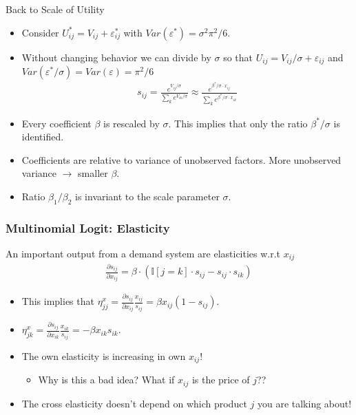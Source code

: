 \begin{frame}{Back to Scale of Utility}
\begin{itemize}
\item Consider $U_{ij}^{*} = V_{ij} + \varepsilon_{ij}^{*}$ with $Var(\varepsilon^{*}) = \sigma^2 \pi^2/6$.
\item Without changing behavior we can divide by $\sigma$ so that $U_{ij} = V_{ij}/\sigma + \varepsilon_{ij}$ and $Var(\varepsilon^{*}/\sigma)=Var(\varepsilon) = \pi^2/6$
\begin{align*}
s_{ij} = \frac{e^{V_{ij}/\sigma}}{\sum_k e^{V_{ik}/\sigma}} \approx \frac{e^{\beta^{*}/\sigma \cdot x_{ij}}}{\sum_k e^{\beta^{*}/\sigma \cdot x_{ik}}}
\end{align*}
\item Every coefficient $\beta$ is rescaled by $\sigma$. This implies that only the ratio $\beta^{*}/\sigma$ is identified. 
\item Coefficients are relative to variance of unobserved factors. More unobserved variance $\longrightarrow$ smaller $\beta$.
\item Ratio $\beta_1/\beta_2$ is invariant to the scale parameter $\sigma$.
\end{itemize}
\end{frame}


\begin{frame}
\frametitle{Multinomial Logit: Elasticity}
An important output from a demand system are elasticities w.r.t $x_{ij}$
\begin{align*}
\frac{\partial s_{ij}}{\partial x_{ij}} = \beta \cdot \left(\mathbb{I}[j = k]\cdot s_{ij} - s_{ij}\cdot s_{ik} \right)
\end{align*}
\begin{itemize}
\item This implies that $ \eta_{jj}^x = \frac{\partial s_{ij}}{\partial x_{ij}} \frac{x_{ij}}{s_{ij}}  = \beta x_{ij} (1-s_{ij})$.
\item  $ \eta_{jk}^x = \frac{\partial s_{ij}}{\partial x_{ik}} \frac{x_{ik}}{s_{ij}}  = -\beta x_{ik} s_{ik}$.

\item The own elasticity is increasing in own $x_{ij}$!
\begin{itemize}
\item Why is this a bad idea? What if $x_{ij}$ is the price of $j$??
\end{itemize}
\item The cross elasticity doesn't depend on which product $j$ you are talking about!
\end{itemize}
\end{frame}


